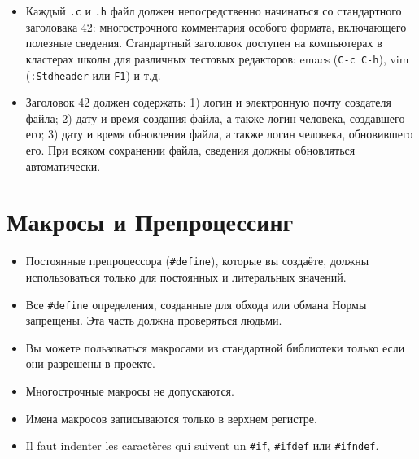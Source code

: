 \documentclass{42-ru}
\begin{document}
        \begin{itemize}

        \item Каждый \texttt{.c}  и \texttt{.h}  файл должен непосредственно начинаться со стандартного заголовака 42:
            многострочного комментария особого формата, включающего полезные сведения.
            Стандартный заголовок доступен на компьютерах в кластерах школы для различных
            тестовых редакторов: emacs (\texttt{C-c C-h}), vim (\texttt{:Stdheader} или \texttt{F1}) и т.д.

        \item Заголовок 42 должен содержать: 1) логин и электронную почту создателя файла;
            2) дату и время создания файла, а также логин человека, создавшего его;
            3) дату и время обновления файла, а также логин человека, обновившего его.
            При всяком сохранении файла, сведения должны обновляться автоматически.

        \end{itemize}

    \newpage


    \section{Макросы и Препроцессинг}

        \begin{itemize}

            \item Постоянные препроцессора (\texttt{#define}), которые вы создаёте, должны использоваться только для постоянных и литеральных значений.

            \item Все \texttt{#define} определения, созданные для обхода или обмана Нормы запрещены. Эта часть должна проверяться людьми.

            \item Вы можете пользоваться макросами из стандартной библиотеки только если они разрешены в проекте.

            \item Многострочные макросы не допускаются.

            \item Имена макросов записываются только в верхнем регистре.

            \item Il faut indenter les caractères qui suivent un \texttt{\#if}, \texttt{\#ifdef} или \texttt{\#ifndef}.

        \end{itemize}
\end{document}
